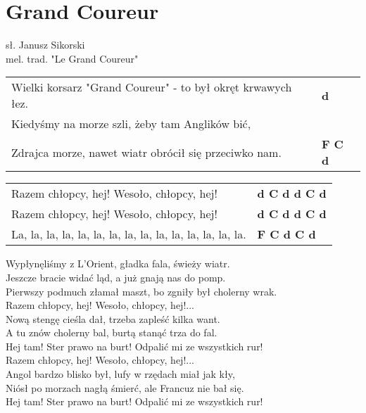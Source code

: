 \section{Grand Coureur}

sł. Janusz Sikorski\\
mel. trad. "Le Grand Coureur"

\vspace{2em}
\begin{tabular}{@{}p{10cm}@{}l@{}}
Wielki korsarz "Grand Coureur" - to był okręt krwawych łez. & \bfseries d\\
Kiedyśmy na morze szli, żeby tam Anglików bić, & \bfseries \\
Zdrajca morze, nawet wiatr obrócił się przeciwko nam. & \bfseries F C d\\
\end{tabular}

\begin{tabular}{@{}p{10cm}@{}l@{}}
Razem chłopcy, hej! Wesoło, chłopcy, hej! & \bfseries d C d d C d\\
Razem chłopcy, hej! Wesoło, chłopcy, hej! & \bfseries d C d d C d\\
La, la, la, la, la, la, la, la, la, la, la, la, la, la, la. & \bfseries F C d C d\\
\end{tabular}

\vspace{1em}
Wypłynęliśmy z L'Orient, gładka fala, świeży wiatr. \\
Jeszcze bracie widać ląd, a już gnają nas do pomp. \\
Pierwszy podmuch złamał maszt, bo zgniły był cholerny wrak. \\

Razem chłopcy, hej! Wesoło, chłopcy, hej!... \\

Nową stengę cieśla dał, trzeba zapleść kilka want. \\
A tu znów cholerny bal, burtą stanąć trza do fal. \\
Hej tam! Ster prawo na burt! Odpalić mi ze wszystkich rur! \\

Razem chłopcy, hej! Wesoło, chłopcy, hej!... \\

Angol bardzo blisko był, lufy w rzędach miał jak kły, \\
Niósł po morzach nagłą śmierć, ale Francuz nie bał się. \\
Hej tam! Ster prawo na burt! Odpalić mi ze wszystkich rur! \\

